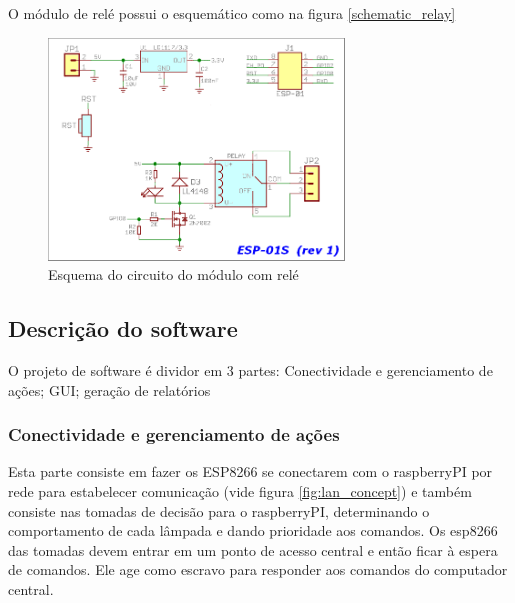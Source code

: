 \documentclass[11pt]{article}
\begin{document}
O módulo de relé possui o esquemático como na figura \ref{schematic_relay}
\begin{figure}[h!]
\caption{\label{fig:schematic_relay}Esquema do circuito do módulo com relé}
\centering
\includegraphics[width=0.7\textwidth]{./schematic_relay.png}
\end{figure}

\subsection{Descrição do software}
\label{sec:org8a2d0fa}
O projeto de software é dividor em 3 partes: Conectividade e gerenciamento de ações; GUI; geração de relatórios
\subsubsection{Conectividade e gerenciamento de ações}
\label{sec:org1f206be}
Esta parte consiste em fazer os ESP8266 se conectarem com o raspberryPI por rede para estabelecer comunicação (vide figura \ref{fig:lan_concept}) e também consiste nas tomadas de decisão para o raspberryPI, determinando o comportamento de cada lâmpada e dando prioridade aos comandos.
Os esp8266 das tomadas devem entrar em um ponto de acesso central e então ficar à espera de comandos. Ele age como escravo para responder aos comandos do computador central.
\end{document}
